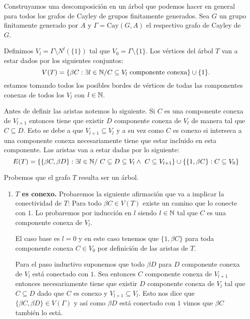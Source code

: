 \documentclass[tesis.tex]{subfiles}
\begin{document}
\begin{obs}\label{desc-grafo-cayley}%
	
	Construyamos una descomposición en un árbol que podemos hacer en general para todos los grafos de Cayley de grupos finitamente generados. 
	Sea $G$ un grupo finitamente generado por $A$ y $\Gamma = \text{Cay}(G,A)$ el respectivo grafo de Cayley de $G$. 
	
	
	Definimos $V_l = \Gamma \setminus N^l(\{1\}) $ tal que $V_0 = \Gamma \setminus \{1\}$. 
	Los vértices del árbol $T$ van a estar dados por los siguientes conjuntos:
	\[
	V(T) = \{  \beta C : \exists l \in \mathbb{N} / C \subseteq V_l \ \text{componente conexa} \} \cup \{ 1 \}.
	\]
	estamos tomando todos los posibles bordes de vértices 
	de todas las componentes conexas de todos los $V_l$ con $l \in \mathbb{N}$.
	 
	Antes de definir las aristas notemos lo siguiente.
	Si $C$ es una componente conexa de $V_{l+1}$ entonces tiene que existir $D$ componente conexa de $V_{l}$ de manera tal que $C \subseteq D$.
	Esto se debe a que $V_{l+1} \subseteq V_{l}$ y a su vez como $C$ es conexo si interseca a una componente conexa necesariamente tiene que estar incluido en esta componente.
	Las aristas van a estar dadas por lo siguiente:
	\[
	E(T) = \{ \{ \beta C, \beta D \} : \exists l \in \mathbb{N} / \ C \subseteq D \subseteq V_l \land \ C \subseteq V_{l+1}  \} \cup \{  \{1,\beta C\} : C \subseteq V_0  \}
	\]
	
	Probemos que el grafo $T$ resulta ser un árbol. 
	
	\begin{enumerate}[$\bullet$]
		\item \textbf{$T$ es conexo.}
		Probaremos la siguiente afirmación que va a implicar la conectividad de $T$:
		Para todo $\beta C \in V(T)$ existe un camino que lo conecte con $1$.
		Lo probaremos por inducción en $l$ siendo $l \in \mathbb{N}$ tal que $C$ es una componente conexa de $V_{l}$.
		
		El caso base es $l = 0$ y en este caso tenemos que $\{ 1, \beta C  \}$ para toda componente conexa $C \in V_{0}$ por definición de las aristas de $T$.
		
		Para el paso inductivo suponemos que todo $\beta D$ para $D$ componente conexa de $V_{l}$ está conectado con $1$.
		Sea entonces $C$ componente conexa de $V_{l+1}$ entonces necesariamente tiene que existir $D$ componente conexa de $V_{l}$ tal que $C \subseteq D$ dado que $C$ es conexo y $V_{l+1} \subseteq V_{l}$.
		Esto nos dice que $\{ \beta C, \beta D \} \in V(\Gamma)$ y así como $\beta D$ está conectado con $1$ vimos que $\beta C$ también lo está.
		

\end{enumerate}
\end{obs}
\end{document}
